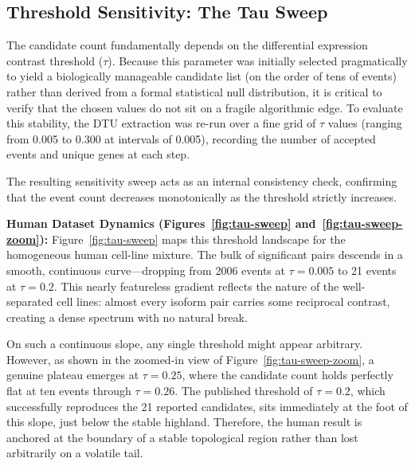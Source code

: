 \subsection*{Threshold Sensitivity: The Tau Sweep}\label{sec:tau-sweep}

The candidate count fundamentally depends on the differential expression contrast threshold ($\tau$). Because this parameter was initially selected pragmatically to yield a biologically manageable candidate list (on the order of tens of events) rather than derived from a formal statistical null distribution, it is critical to verify that the chosen values do not sit on a fragile algorithmic edge. To evaluate this stability, the DTU extraction was re-run over a fine grid of $\tau$ values (ranging from 0.005 to 0.300 at intervals of 0.005), recording the number of accepted events and unique genes at each step.

The resulting sensitivity sweep acts as an internal consistency check, confirming that the event count decreases monotonically as the threshold strictly increases.

\textbf{Human Dataset Dynamics (Figures~\ref{fig:tau-sweep} and~\ref{fig:tau-sweep-zoom}):} Figure~\ref{fig:tau-sweep} maps this threshold landscape for the homogeneous human cell-line mixture. The bulk of significant pairs descends in a smooth, continuous curve---dropping from 2006 events at $\tau = 0.005$ to 21 events at $\tau = 0.2$. This nearly featureless gradient reflects the nature of the well-separated cell lines: almost every isoform pair carries some reciprocal contrast, creating a dense spectrum with no natural break.

On such a continuous slope, any single threshold might appear arbitrary. However, as shown in the zoomed-in view of Figure~\ref{fig:tau-sweep-zoom}, a genuine plateau emerges at $\tau = 0.25$, where the candidate count holds perfectly flat at ten events through $\tau = 0.26$. The published threshold of $\tau = 0.2$, which successfully reproduces the 21 reported candidates, sits immediately at the foot of this slope, just below the stable highland. Therefore, the human result is anchored at the boundary of a stable topological region rather than lost arbitrarily on a volatile tail.

